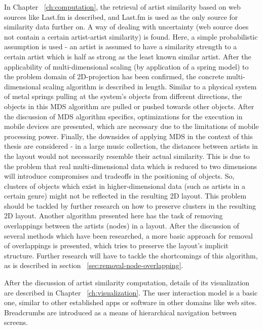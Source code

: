 In Chapter ~\ref{ch:computation}, the retrieval of artist similarity based on web sources like Last.fm is described, and Last.fm is used as the only source for similarity data further on. A way of dealing with uncertainty (web source does not contain a certain artist-artist similarity) is found. Here, a simple probabilistic assumption is used - an artist is assumed to have a similarity strength to a certain artist which is half as strong as the least known similar artist. After the applicability of multi-dimensional scaling (by application of a spring model) to the problem domain of 2D-projection has been confirmed, the concrete multi-dimensional scaling algorithm is described in length. Similar to a physical system of metal springs pulling at the system's objects from different directions, the objects in this MDS algorithm are pulled or pushed towards other objects. After the discussion of MDS algorithm specifics, optimizations for the execution in mobile devices are presented, which are necessary due to the limitations of mobile processing power. Finally, the downsides of applying MDS in the context of this thesis are considered - in a large music collection, the distances between artists in the layout would not necessarily resemble their actual similarity. This is due to the problem that real multi-dimensional data which is reduced to two dimensions will introduce compromises and tradeoffs in the positioning of objects. So, clusters of objects which exist in higher-dimensional data (such as artists in a certain genre) might not be reflected in the resulting 2D layout. This problem should be tackled by further research on how to preserve clusters in the resulting 2D layout.
Another algorithm presented here has the task of removing overlappings between the artists (nodes) in a layout. After the discussion of several methods which have been researched, a more basic approach for removal of overlappings is presented, which tries to preserve the layout's implicit structure. Further research will have to tackle the shortcomings of this algorithm, as is described in section ~\ref{sec:removal-node-overlapping}.

After the discussion of artist similarity computation, details of its visualization are described in Chapter ~\ref{ch:visualization}. The user interaction model is a basic one, similar to other established apps or software in other domains like web sites. Breadcrumbs are introduced as a means of hierarchical navigation between screens.

